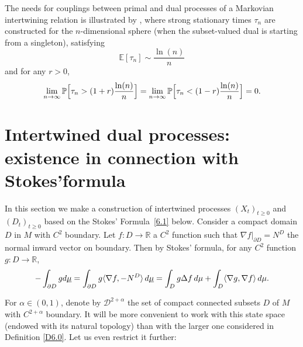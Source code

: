 \documentclass[JEP,XML,SOM,Unicode,NoFloatCountersInSection,published]{cedram}
\theoremstyle{plain}
\theoremstyle{definition}
\newcommand{\EE}{{\mathbb E}}
\newcommand{\RR}{{\mathbb R}}
\newcommand{\PP}{{\mathbb P}}
\newcommand{\SD}{{\mathscr D}}
\newcommand{\barD}{D}
\newcommand{\usm}{{\underline{\smash{\mu}}}}
\let\f\frac
\let\a\alpha
\let\n\nabla
\begin{document}
The needs for couplings between primal and dual processes of a Markovian intertwining relation is illustrated by \cite{ACM3:22}, where strong stationary times $\tau_n$ are constructed for the $n$-dimensional sphere (when the subset-valued dual is starting from a singleton), satisfying
\[
\EE[\tau_n]\sim \f{\ln(n)}n
\]
and for any $r>0$,
\[
\lim_{n\to\infty}\PP\Bigl[\tau_n>(1+r)\f{\ln(n)}n\Bigr]=\lim_{n\to\infty}\PP\Bigl[\tau_n<(1-r)\f{\ln(n)}n\Bigr]=0.
\]

\section{Intertwined dual processes: existence in connection with Stokes'\nobreakspace formula}
\label{Section6}

In this section we make a construction of intertwined processes $(X_t)_{t\geq 0}$ and $(D_t)_{t\geq 0}$ based on the Stokes' Formula~\eqref{6.1} below. Consider a compact domain $D$ in $M$ with $C^2$ boundary. Let $f: \barD \to \RR$ a $C^2$ function such that $\n f|_{\partial D}=N^D$ the normal inward vector on boundary. Then by Stokes' formula, for any $C^2$ function $g: \barD \to \RR$,
\begin{equation}
\label{6.1}
-\int_{\partial D}g d\usm =\int_{\partial D} g\langle \n f, -N^D\rangle \,d\usm =\int_Dg\Delta f\, d\mu+\int_D\langle \n g,\n f\rangle \, d\mu.
\end{equation}

For $\a\in(0,1)$, denote by $\SD^{2+\a}$ the set of compact connected subsets $D$ of $M$ with $C^{2+\a}$ boundary.
It will be more convenient to work with this state space (endowed with its natural topology) than with the larger one considered in Definition \ref{D6.0}.
Let us even restrict it further:
\end{document}
